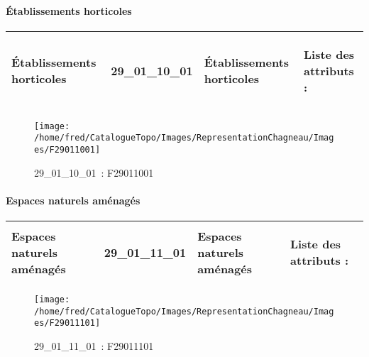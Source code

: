 \documentclass[12pt,titlepage,oneside]{book}
\begin{document}
\paragraph{Établissements horticoles}
\noindent
\vspace{\baselineskip}

\renewcommand{\arraystretch}{1.2}
\begin{supertabular}{|p{10cm}|c|p{13cm}|p{12cm}|}
 Établissements horticoles & 29\_01\_10\_01 & Établissements horticoles & Liste des attributs :
\begin{enumerate}
\end{enumerate}
\\
\hline
\end{supertabular}
\begin{figure}[h!]
  \hfill         %
  \begin{minipage}[t]{3cm}
    \begin{center}
      \texttt{[image: /home/fred/CatalogueTopo/Images/RepresentationChagneau/Images/F29011001]}
      \caption[~29\_01\_10\_01]{\small{29\_01\_10\_01~:} \tiny{F29011001}}\label{F29011001}
    \end{center}
  \end{minipage}
\end{figure}


\paragraph{Espaces naturels aménagés}
\noindent
\vspace{\baselineskip}

\renewcommand{\arraystretch}{1.2}
\begin{supertabular}{|p{10cm}|c|p{13cm}|p{12cm}|}
 Espaces naturels aménagés & 29\_01\_11\_01 & Espaces naturels aménagés & Liste des attributs :
\begin{enumerate}
\end{enumerate}
\\
\hline
\end{supertabular}
\begin{figure}[h!]
  \hfill         %
  \begin{minipage}[t]{3cm}
    \begin{center}
      \texttt{[image: /home/fred/CatalogueTopo/Images/RepresentationChagneau/Images/F29011101]}
      \caption[~29\_01\_11\_01]{\small{29\_01\_11\_01~:} \tiny{F29011101}}\label{F29011101}
    \end{center}
  \end{minipage}
\end{figure}
\end{document}
